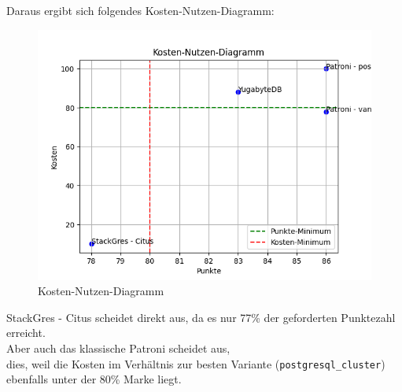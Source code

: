 \begin{flushleft}
    Daraus ergibt sich folgendes Kosten-Nutzen-Diagramm:
    \begin{figure}[H]
        \centering
        \includegraphics[width=1\linewidth]{source/cost_benefit_diagram/cost_benefit_diagram}
        \caption{Kosten-Nutzen-Diagramm}
        \label{fig:cost_benefit_diagram}
    \end{figure}
    StackGres - Citus scheidet direkt aus, da es nur 77\% der geforderten Punktezahl erreicht.\\
    Aber auch das klassische Patroni scheidet aus,\\
    dies, weil die Kosten im Verhältnis zur besten Variante (\texttt{postgresql\_cluster}) ebenfalls unter der 80\% Marke liegt.
\end{flushleft}